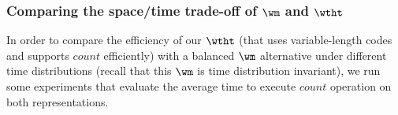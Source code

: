 



\subsubsection{Comparing the space/time trade-off of $\wm$ and $\wtht$}
\label{sec:time_exp}
In order to compare the efficiency of our $\wtht$ (that uses variable-length codes and supports $count$ efficiently)
 with a balanced $\wm$ alternative under 
different time distributions (recall that this $\wm$ is time distribution invariant), 
we run some experiments that evaluate the average time to execute $count$ operation on
both representations.

